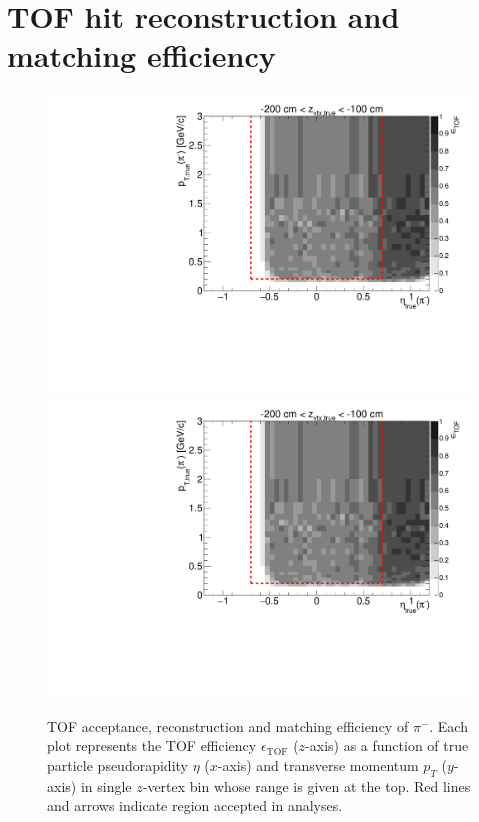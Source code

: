 
\chapter{TOF hit reconstruction and matching efficiency}\label{appendix:tofEff}

\begin{figure}[hb]
\caption[TOF acceptance, reconstruction and matching efficiency of $\pi^{-}$.]{TOF acceptance, reconstruction and matching efficiency of $\pi^{-}$. Each plot represents the TOF efficiency $\epsilon_{\text{TOF}}$ ($z$-axis) as a function of true particle pseudorapidity $\eta$ ($x$-axis) and transverse momentum $p_{T}$ ($y$-axis) in single $z$-vertex bin whose range is given at the top. Red lines and arrows indicate region accepted in analyses.}\label{fig:tofEff_pion_minus}
\centering
\parbox{0.495\textwidth}{
  \centering
  \includegraphics[width=\linewidth,page=3]{graphics/eff/Eff2D_TOF_pion_Minus.pdf}\\
  \includegraphics[width=\linewidth,page=5]{graphics/eff/Eff2D_TOF_pion_Minus.pdf}\\
}
\end{figure}
